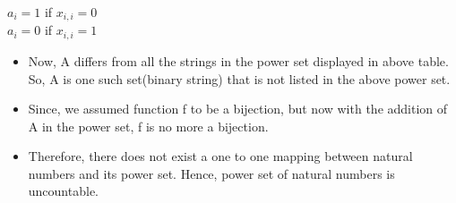 \documentclass[14pt, letterpaper]{article}
\begin{document}
\begin{center}
$a_{i}=1$ if $x_{i,i}=0$ \\
$a_{i}=0$ if $x_{i,i}=1$ \\
\end{center}
\begin{itemize}

\item Now, A differs from all the strings in the power set displayed in above table. So, A is one such set(binary string) that is not listed in the above power set. 
\item Since, we assumed function f to be a bijection, but now with the addition of A in the power set, f is no more a bijection.  
\item Therefore, there does not exist a one to one mapping between natural numbers and its power set. Hence, power set of natural numbers is uncountable.
\end{itemize}
\end{document}
